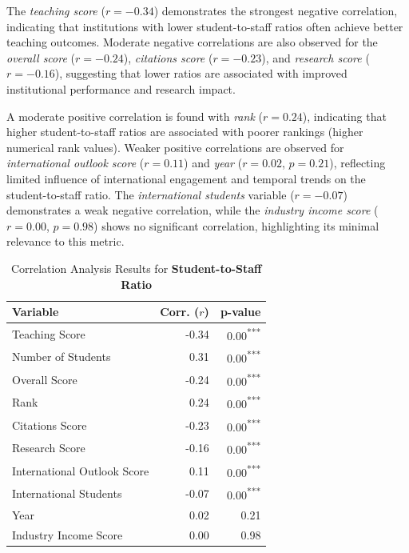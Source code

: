 \documentclass[sigconf]{acmart}
\begin{document}
The \textit{teaching score} ($r = -0.34$) demonstrates the strongest negative correlation, indicating that institutions with lower student-to-staff ratios often achieve better teaching outcomes. Moderate negative correlations are also observed for the \textit{overall score} ($r = -0.24$), \textit{citations score} ($r = -0.23$), and \textit{research score} ($r = -0.16$), suggesting that lower ratios are associated with improved institutional performance and research impact.

A moderate positive correlation is found with \textit{rank} ($r = 0.24$), indicating that higher student-to-staff ratios are associated with poorer rankings (higher numerical rank values). Weaker positive correlations are observed for \textit{international outlook score} ($r = 0.11$) and \textit{year} ($r = 0.02$, $p = 0.21$), reflecting limited influence of international engagement and temporal trends on the student-to-staff ratio. The \textit{international students} variable ($r = -0.07$) demonstrates a weak negative correlation, while the \textit{industry income score} ($r = 0.00$, $p = 0.98$) shows no significant correlation, highlighting its minimal relevance to this metric.

\begin{table}[h!]
	\centering
	\caption{Correlation Analysis Results for \textbf{Student-to-Staff Ratio}}
	\label{tab:correlation_student_staff_ratio}
	\begin{tabular}{|l|r|r|}
		\hline
		\textbf{Variable} & \textbf{Corr. ($r$)} & \textbf{p-value} \\
		\hline
		Teaching Score & -0.34 & 0.00\textsuperscript{***} \\
		Number of Students & 0.31 & 0.00\textsuperscript{***} \\
		Overall Score & -0.24 & 0.00\textsuperscript{***} \\
		Rank & 0.24 & 0.00\textsuperscript{***} \\
		Citations Score & -0.23 & 0.00\textsuperscript{***} \\
		Research Score & -0.16 & 0.00\textsuperscript{***} \\
		International Outlook Score & 0.11 & 0.00\textsuperscript{***} \\
		International Students & -0.07 & 0.00\textsuperscript{***} \\
		Year & 0.02 & 0.21 \\
		Industry Income Score & 0.00 & 0.98 \\
		\hline
	\end{tabular}
\end{table}
\end{document}
